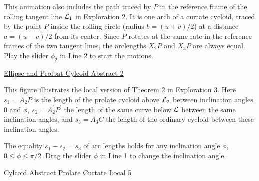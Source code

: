 \documentclass{ximera}
\begin{document}
\begin{exploration} \label{CurtateProlateCycloids}

This animation also includes the path traced by $P$  in the reference frame of the rolling tangent line ${\cal L}_1$ in Exploration 2. It is one arch of a curtate cycloid, traced by the point $P$ inside the rolling circle (radius $b = (u+v)/2$) at a distance $a=(u-v)/2$ from its center. Since $P$ rotates at the same rate in the reference frames of the two tangent lines, the arclengths $X_2P$ and $X_3P$ are always equal. Play the slider $\phi_2$ in Line 2 to start the motions.

\begin{onlineOnly}
    \begin{center}
\end{center}
\end{onlineOnly}

\href{https://www.desmos.com/calculator/aotcfo08mn}{Ellipse and Prolbat Cylcoid Abstract 2}
\end{exploration}



\begin{exploration} \label{Theorem2Local}
This figure illustrates the local version of Theorem 2 in Exploration 3. Here $s_1 = A_2P$ is the length of the prolate cycloid above ${\cal L}_2$ between inclination angles $0$ and $\phi$, $s_2= A_2^\prime P^\prime$ the length of the same curve below ${\cal L}$ between the same inclination angles, and $s_3 = A_3C$ the length of the ordinary cycloid between these inclination angles. 

The equality $s_1 - s_2 = s_3$ of arc lengths holds for any inclination angle $\phi$, $0\leq \phi \leq \pi/2$. Drag the slider $\phi$ in Line 1 to change the inclination angle.




\begin{onlineOnly}
    \begin{center}
\end{center}
\end{onlineOnly}

\href{https://www.desmos.com/calculator/i6scaz6pss}{Cylcoid Abstract Prolate Curtate Local 5}
\end{exploration}
\end{document}
